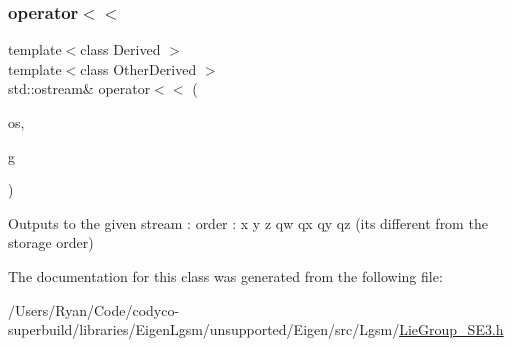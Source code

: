 \subsubsection{\texorpdfstring{operator$<$$<$}{operator<<}}
{\footnotesize\ttfamily template$<$class Derived $>$ \\
template$<$class Other\+Derived $>$ \\
std\+::ostream\& operator$<$$<$ (\begin{DoxyParamCaption}\item[{std\+::ostream \&}]{os,  }\item[{const \hyperlink{class_lie_group_base}{Lie\+Group\+Base}$<$ Array$<$ typename internal\+::traits$<$ Derived $>$\+::\hyperlink{class_lie_group_base_3_01_array_3_01typename_01internal_1_1traits_3_01_derived_01_4_1_1_scalar_0d6d4b5459662fc32c7117aee50362fb1_a831695c575380c9a1df32eff9fc4a8c6}{Scalar}, 7, 1 $>$, Derived $>$ \&}]{g }\end{DoxyParamCaption})\hspace{0.3cm}{\ttfamily [friend]}}

Outputs to the given stream \+: order \+: x y z qw qx qy qz (it\textquotesingle{}s different from the storage order) 

The documentation for this class was generated from the following file\+:\begin{DoxyCompactItemize}
\item 
/\+Users/\+Ryan/\+Code/codyco-\/superbuild/libraries/\+Eigen\+Lgsm/unsupported/\+Eigen/src/\+Lgsm/\hyperlink{_lie_group___s_e3_8h}{Lie\+Group\+\_\+\+S\+E3.\+h}\end{DoxyCompactItemize}
